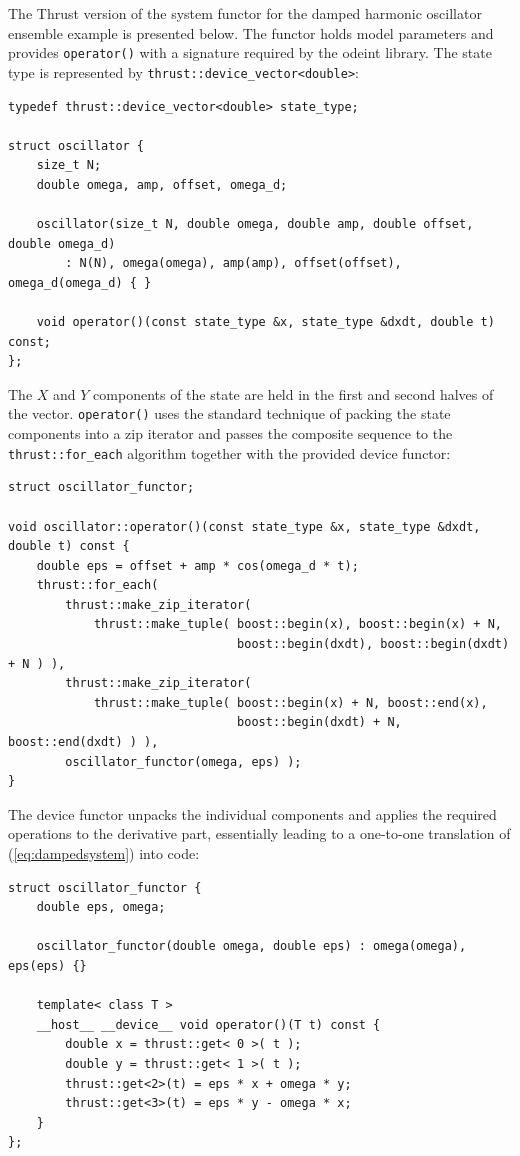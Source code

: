 \documentclass[final]{siamltex}
\newcommand{\code}[1]{\lstinline|#1|}
\newcommand{\eqref}[1]{(\ref{#1})}
\begin{document}
The Thrust version of the system functor for the damped harmonic oscillator
ensemble example is presented below. The functor holds model parameters and
provides \code{operator()} with a signature required by the odeint library. The
state type is represented by \code{thrust::device_vector<double>}:
\begin{lstlisting}
typedef thrust::device_vector<double> state_type;

struct oscillator {
    size_t N;
    double omega, amp, offset, omega_d;

    oscillator(size_t N, double omega, double amp, double offset, double omega_d)
        : N(N), omega(omega), amp(amp), offset(offset), omega_d(omega_d) { }

    void operator()(const state_type &x, state_type &dxdt, double t) const;
};
\end{lstlisting}
The $X$ and $Y$ components of the state are held in the first and second halves of the
vector.  \code{operator()} uses the standard technique of
packing the state components into a zip iterator and passes the composite
sequence to the \code{thrust::for_each} algorithm together with the provided device
functor:
\begin{lstlisting}[firstnumber=12]
struct oscillator_functor;

void oscillator::operator()(const state_type &x, state_type &dxdt, double t) const {
    double eps = offset + amp * cos(omega_d * t);
    thrust::for_each(
        thrust::make_zip_iterator(
            thrust::make_tuple( boost::begin(x), boost::begin(x) + N,
                                boost::begin(dxdt), boost::begin(dxdt) + N ) ),
        thrust::make_zip_iterator(
            thrust::make_tuple( boost::begin(x) + N, boost::end(x),
                                boost::begin(dxdt) + N, boost::end(dxdt) ) ),
        oscillator_functor(omega, eps) );
}
\end{lstlisting}
The device functor unpacks the individual components and applies the required
operations to the derivative part, essentially leading to a one-to-one translation of \eqref{eq:dampedsystem} into code:
\begin{lstlisting}[firstnumber=last]
struct oscillator_functor {
    double eps, omega;

    oscillator_functor(double omega, double eps) : omega(omega), eps(eps) {}

    template< class T >
    __host__ __device__ void operator()(T t) const {
        double x = thrust::get< 0 >( t );
        double y = thrust::get< 1 >( t );
        thrust::get<2>(t) = eps * x + omega * y;
        thrust::get<3>(t) = eps * y - omega * x;
    }
};
\end{lstlisting}
\end{document}
